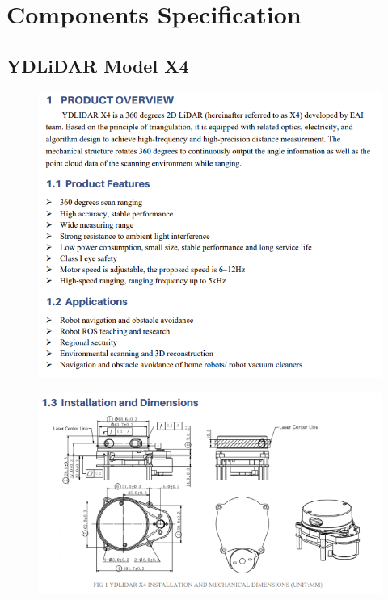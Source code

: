 \chapter{Components Specification}
\label{appen:a}

\section*{YDLiDAR Model X4}

\begin{figure}[H]
	\centering
	\includegraphics[width=1\textwidth]{Figures/Appendecis/x4-model-1}
\end{figure}

\begin{figure}[H]
	\centering
	\includegraphics[width=1\textwidth]{Figures/Appendecis/x4-model-2}
\end{figure}

